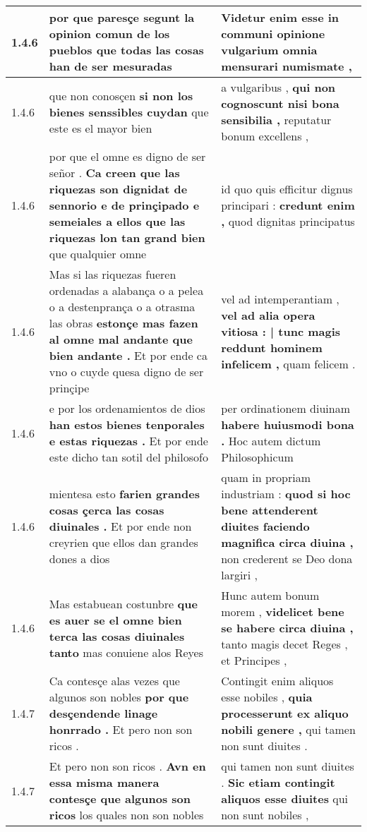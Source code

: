 \begin{tabular}{|p{1cm}|p{6.5cm}|p{6.5cm}|}
1.4.6 & por que paresçe \textbf{ segunt la opinion comun de los pueblos } que todas las cosas han de ser mesuradas & Videtur enim esse \textbf{ in communi opinione vulgarium } omnia mensurari numismate , \\\hline
1.4.6 & que non conosçen \textbf{ si non los bienes senssibles cuydan } que este es el mayor bien & a vulgaribus , \textbf{ qui non cognoscunt nisi bona sensibilia , } reputatur bonum excellens , \\\hline
1.4.6 & por que el omne es digno de ser señor . \textbf{ Ca creen que las riquezas son dignidat de sennorio e de prinçipado e semeiales a ellos que las riquezas lon tan grand bien } que qualquier omne & id quo quis efficitur dignus principari : \textbf{ credunt enim , } quod dignitas principatus \\\hline
1.4.6 & Mas si las riquezas fueren ordenadas a alabança o a pelea o a destenprança o a otrasma las obras \textbf{ estonçe mas fazen al omne mal andante que bien andante . } Et por ende ca vno o cuyde quesa digno de ser prinçipe & vel ad intemperantiam , \textbf{ vel ad alia opera vitiosa : | tunc magis reddunt hominem infelicem , } quam felicem . \\\hline
1.4.6 & e por los ordenamientos de dios \textbf{ han estos bienes tenporales e estas riquezas . } Et por ende este dicho tan sotil del philosofo & per ordinationem diuinam \textbf{ habere huiusmodi bona . } Hoc autem dictum Philosophicum \\\hline
1.4.6 & mientesa esto \textbf{ farien grandes cosas çerca las cosas diuinales . } Et por ende non creyrien que ellos dan grandes dones a dios & quam in propriam industriam : \textbf{ quod si hoc bene attenderent diuites faciendo magnifica circa diuina , } non crederent se Deo dona largiri , \\\hline
1.4.6 & Mas estabuean costunbre \textbf{ que es auer se el omne bien terca las cosas diuinales tanto } mas conuiene alos Reyes & Hunc autem bonum morem , \textbf{ videlicet bene se habere circa diuina , } tanto magis decet Reges , et Principes , \\\hline
1.4.7 & Ca contesçe alas vezes que algunos son nobles \textbf{ por que desçendende linage honrrado . } Et pero non son ricos . & Contingit enim aliquos esse nobiles , \textbf{ quia processerunt ex aliquo nobili genere , } qui tamen non sunt diuites . \\\hline
1.4.7 & Et pero non son ricos . \textbf{ Avn en essa misma manera contesçe que algunos son ricos } los quales non son nobles & qui tamen non sunt diuites . \textbf{ Sic etiam contingit aliquos esse diuites } qui non sunt nobiles , \\\hline

\end{tabular}
